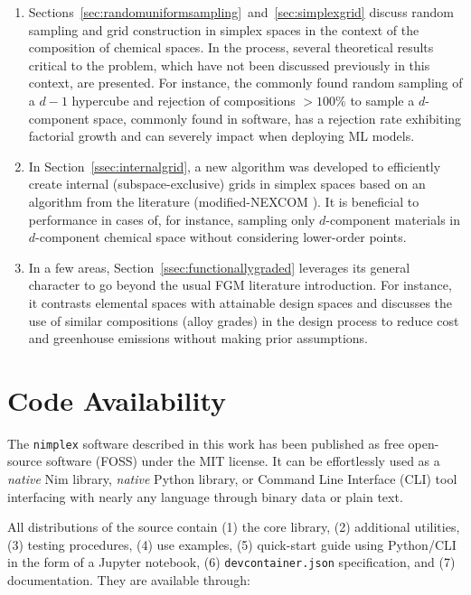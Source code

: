 \begin{enumerate}
    
    \item Sections~\ref{sec:randomuniformsampling}~and~\ref{sec:simplexgrid} discuss random sampling and grid construction in simplex spaces in the context of the composition of chemical spaces. In the process, several theoretical results critical to the problem, which have not been discussed previously in this context, are presented. For instance, the commonly found random sampling of a $d-1$ hypercube and rejection of compositions $>100\%$ to sample a $d$-component space, commonly found in software, has a rejection rate exhibiting factorial growth and can severely impact when deploying ML models.
    
    \item In Section~\ref{ssec:internalgrid}, a new algorithm was developed to efficiently create internal (subspace-exclusive) grids in simplex spaces based on an algorithm from the literature (modified-NEXCOM \cite{Chasalow1995AlgorithmPoints}). It is beneficial to performance in cases of, for instance, sampling only $d$-component materials in $d$-component chemical space without considering lower-order points.

    \item In a few areas, Section~\ref{ssec:functionallygraded} leverages its general character to go beyond the usual FGM literature introduction. For instance, it contrasts elemental spaces with attainable design spaces and discusses the use of similar compositions (alloy grades) in the design process to reduce cost and greenhouse emissions without making prior assumptions.
    
\end{enumerate}

\section*{Code Availability}

The \texttt{nimplex} software described in this work has been published as free open-source software (FOSS) under the MIT license. It can be effortlessly used as a \emph{native} Nim library, \emph{native} Python library, or Command Line Interface (CLI) tool interfacing with nearly any language through binary data or plain text.

All distributions of the source contain (1) the core library, (2) additional utilities, (3) testing procedures, (4) use examples, (5) quick-start guide using Python/CLI in the form of a Jupyter notebook, (6) \texttt{devcontainer.json} specification, and (7) documentation. They are available through:

